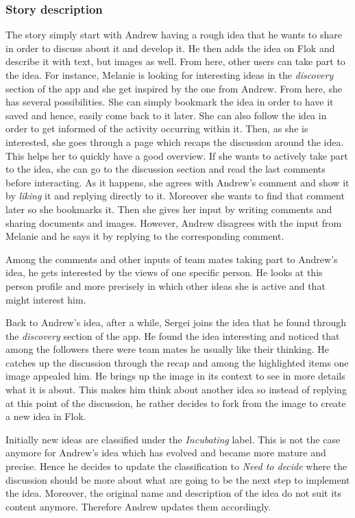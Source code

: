 \documentclass[a4paper,12pt, oneside]{article}
\begin{document}
\subsubsection*{Story description}
The story simply start with Andrew having a rough idea that he wants to share in order to discuss about it and develop it.
He then adds the idea on Flok and describe it with text, but images as well.
From here, other users can take part to the idea. For instance, Melanie is looking for interesting ideas in the \emph{discovery} section of the app and she get inspired by the one from Andrew.
From here, she has several possibilities.
She can simply bookmark the idea in order to have it saved and hence, easily come back to it later.
She can also follow the idea in order to get informed of the activity occurring within it.
Then, as she is interested, she goes through a page which recaps the discussion around the idea.
This helps her to quickly have a good overview.
If she wants to actively take part to the idea, she can go to the discussion section and read the last comments before interacting.
As it happens, she agrees with Andrew's comment and show it by \emph{liking} it and replying directly to it.
Moreover she wants to find that comment later so she bookmarks it.
Then she gives her input by writing comments and sharing documents and images.
However, Andrew disagrees with the input from Melanie and he says it by replying to the corresponding comment.

Among the comments and other inputs of team mates taking part to Andrew's idea, he gets interested by the views of one specific person.
He looks at this person profile and more precisely in which other ideas she is active and that might interest him.

Back to Andrew's idea, after a while, Sergei joins the idea that he found through the \emph{discovery} section of the app.
He found the idea interesting and noticed that among the followers there were team mates he usually like their thinking.
He catches up the discussion through the recap and among the highlighted items one image appealed him.
He brings up the image in its context to see in more details what it is about.
This makes him think about another idea so instead of replying at this point of the discussion, he rather decides to fork from the image to create a new idea in Flok.

Initially new ideas are classified under the \emph{Incubating} label.
This is not the case anymore for Andrew's idea which has evolved and became more mature and precise.
Hence he decides to update the classification to \emph{Need to decide} where the discussion should be more about what are going to be the next step to implement the idea.
Moreover, the original name and description of the idea do not suit its content anymore.
Therefore Andrew updates them accordingly.
\end{document}
